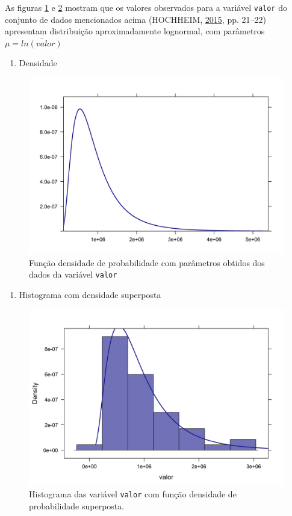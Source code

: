 \documentclass[a4paper]{article}
\providecommand{\tightlist}{%
  \setlength{\itemsep}{0pt}\setlength{\parskip}{0pt}}
\let\code=\texttt
\begin{document}
As figuras \ref{fig:densidade} e \ref{fig:hist_densidade} mostram que os
valores observados para a variável \code{valor} do conjunto de dados
mencionados acima (HOCHHEIM, \protect\hyperlink{ref-hochheim}{2015}, pp.
21--22) apresentam distribuição aproximadamente lognormal, com
parâmetros \(\mu = \bar{ln(valor)}\)

\newpage

\begin{enumerate}
\def\labelenumi{\alph{enumi}.}
\tightlist
\item
  Densidade
\end{enumerate}

\begin{figure}[H]

{\centering \includegraphics[width=0.5\linewidth]{images/densidade-1} 

}

\caption{Função densidade de probabilidade com parâmetros obtidos dos dados da variável \code{valor}}\label{fig:densidade}
\end{figure}

\begin{enumerate}
\def\labelenumi{\alph{enumi}.}
\setcounter{enumi}{1}
\tightlist
\item
  Histograma com densidade superposta
\end{enumerate}

\begin{figure}[H]

{\centering \includegraphics[width=0.5\linewidth]{images/hist_densidade-1} 

}

\caption{Histograma das variável \code{valor} com função densidade de probabilidade superposta.}\label{fig:hist_densidade}
\end{figure}
\end{document}
